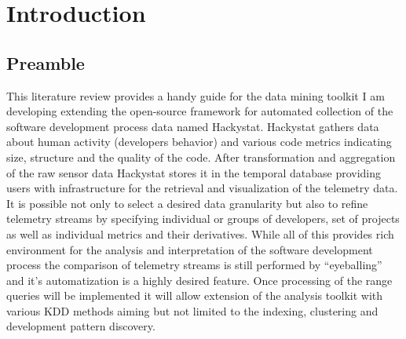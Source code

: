 \chapter{Introduction}
\section{Preamble}
This literature review provides a handy guide for the data mining toolkit I am developing extending the open-source framework for automated collection of the software development process data named Hackystat. Hackystat gathers data about human activity (developers behavior) and various code metrics indicating size, structure and the quality of the code. After transformation and aggregation of the raw sensor data Hackystat stores it in the temporal database providing users with infrastructure for the retrieval and visualization of the telemetry data. It is possible not only to select a desired data granularity but also to refine telemetry streams by specifying individual or groups of developers, set of projects as well as individual metrics and their derivatives. While all of this provides rich environment for the analysis and interpretation of the software development process the comparison of telemetry streams is still performed by ``eyeballing'' and it's automatization is a highly desired feature. Once processing of the range queries will be implemented it will allow extension of the analysis toolkit with various KDD methods aiming but not limited to the indexing, clustering and development pattern discovery.


